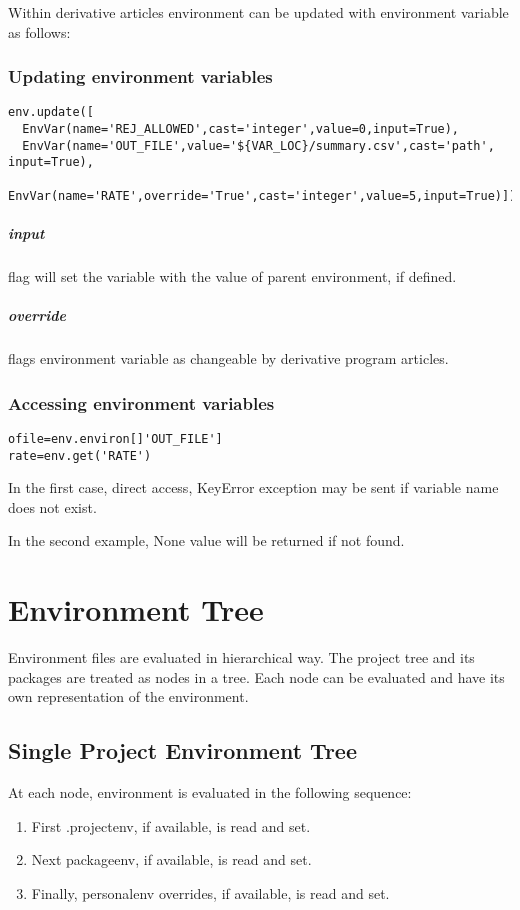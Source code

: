 \documentclass[design.tex]{subfiles}
\begin{document}
Within derivative articles environment can be updated with environment variable as follows:

\subsection{Updating environment variables}
\begin{lstlisting}
env.update([
  EnvVar(name='REJ_ALLOWED',cast='integer',value=0,input=True),
  EnvVar(name='OUT_FILE',value='${VAR_LOC}/summary.csv',cast='path', input=True),
  EnvVar(name='RATE',override='True',cast='integer',value=5,input=True)])
\end{lstlisting}

\paragraph{input} flag will set the variable with the value of parent environment, if defined.
\paragraph{override} flags environment variable as changeable by derivative program articles.

\subsection{Accessing environment variables}
\begin{lstlisting}
ofile=env.environ[]'OUT_FILE']
rate=env.get('RATE')
\end{lstlisting}

In the first case, direct access, KeyError exception may be sent if variable name does not exist.

In the second example, None value will be returned if not found. 

\chapter{Environment Tree}
Environment files are evaluated in hierarchical way.  The project tree and its packages are treated as nodes in a tree.  Each node can be evaluated and have its own representation of the environment.
 
\section{Single Project Environment Tree}
At each node, environment is evaluated in the following sequence:
\begin{enumerate}
	\item First .projectenv, if available, is read and set.
	\item Next packageenv, if available, is read and set.
	\item Finally, personalenv overrides, if available, is read and set.
\end{enumerate} 
\end{document}
